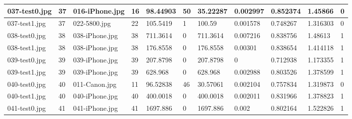 \begin{landscape}
\begin{longtable}{|p{2cm}|p{1cm}|p{2cm}|p{1cm}|p{2cm}|p{1cm}|p{2cm}|p{2cm}|p{2cm}|p{2cm}|p{1cm}|}
		037-test0.jpg   & 37               & 016-iPhone.jpg        & 16                          & 98.44903              & 50                      & 35.22287                   & 0.002997              & 0.852374              & 1.45866                  & 0                \\ \hline
		037-test1.jpg   & 37               & 022-5800.jpg          & 22                          & 105.5419              & 1                       & 100.59                     & 0.001578              & 0.748267              & 1.316303                 & 0                \\ \hline
		038-test0.jpg   & 38               & 038-iPhone.jpg        & 38                          & 711.3614              & 0                       & 711.3614                   & 0.007216              & 0.838756              & 1.48613                  & 1                \\ \hline
		038-test1.jpg   & 38               & 038-iPhone.jpg        & 38                          & 176.8558              & 0                       & 176.8558                   & 0.00301               & 0.838654              & 1.414118                 & 1                \\ \hline
		039-test0.jpg   & 39               & 039-iPhone.jpg        & 39                          & 207.8798              & 0                       & 207.8798                   & 0                     & 0.712938              & 1.173355                 & 1                \\ \hline
		039-test1.jpg   & 39               & 039-iPhone.jpg        & 39                          & 628.968               & 0                       & 628.968                    & 0.002988              & 0.803526              & 1.378599                 & 1                \\ \hline
		040-test0.jpg   & 40               & 011-Canon.jpg         & 11                          & 96.52838              & 46                      & 30.57061                   & 0.002104              & 0.757834              & 1.319873                 & 0                \\ \hline
		040-test1.jpg   & 40               & 040-iPhone.jpg        & 40                          & 400.0018              & 0                       & 400.0018                   & 0.002011              & 0.831966              & 1.378823                 & 1                \\ \hline
		041-test0.jpg   & 41               & 041-iPhone.jpg        & 41                          & 1697.886              & 0                       & 1697.886                   & 0.002                 & 0.802164              & 1.522826                 & 1                \\ \hline

\end{longtable}
\end{landscape}

